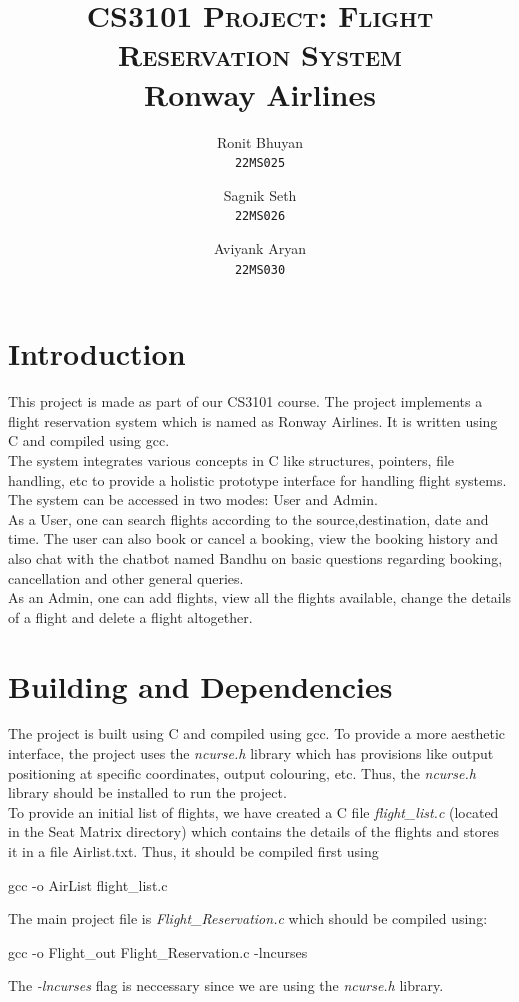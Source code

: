 \documentclass[a4paper]{scrartcl}
\title{
        \Large\textsc{CS3101 Project: Flight Reservation System} \\
        \vspace{10pt}
        \Huge\textbf{Ronway Airlines} \\
}
\author{Ronit Bhuyan \\ \texttt{22MS025} \and Sagnik Seth \\ \texttt{22MS026} \and   Aviyank Aryan \\ \texttt{22MS030}}
\date{}
\begin{document}
\maketitle
\tableofcontents
\section{Introduction}
This project is made as part of our CS3101 course. The project implements a flight reservation system which is named as Ronway Airlines. It is written using C and compiled using gcc. \\[0.3cm]
The system integrates various concepts in C like structures, pointers, file handling, etc to provide a holistic prototype interface for handling flight systems. \\[0.3cm]
The system can be accessed in two modes: User and Admin.\\[0.3cm]
As a User, one can search flights according to the source,destination, date and time. The user can also book or cancel a booking, view the booking history and also chat with the chatbot named Bandhu on basic questions regarding booking, cancellation and other general queries.\\[0.3cm]
As an Admin, one can add flights, view all the flights available, change the details of a flight and delete a flight altogether.
\section{Building and Dependencies}
The project is built using C and compiled using gcc. To provide a more aesthetic interface, the project uses the \textit{ncurse.h} library which has provisions like output positioning at specific coordinates, output colouring, etc. Thus, the \textit{ncurse.h} library should be installed to run the project.\\[0.3cm]
To provide an initial list of flights, we have created a C file \textit{flight\_list.c} (located in the Seat Matrix directory) which contains the details of the flights and stores it in a file Airlist.txt. Thus, it should be compiled first using 
\begin{center}
    gcc -o AirList flight\_list.c
\end{center}
The main project file is \textit{Flight\_Reservation.c} which should be compiled using: 
\begin{center}
    gcc -o Flight\_out Flight\_Reservation.c -lncurses
\end{center}
The \textit{-lncurses} flag is neccessary since we are using the \textit{ncurse.h} library.\\[0.3cm]
\end{document}
